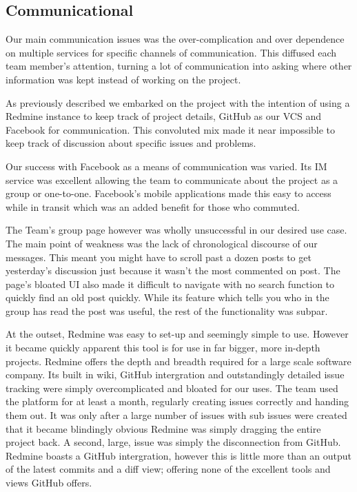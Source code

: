 \documentclass{l3proj}
\begin{document}
\subsection{Communicational}
Our main communication issues was the over-complication and over dependence on multiple services for specific channels of communication. This diffused each team member's attention, turning a lot of communication into asking where other information was kept instead of working on the project.

As previously described we embarked on the project with the intention of using a Redmine instance to keep track of project details, GitHub as our VCS and Facebook for communication. This convoluted mix made it near impossible to keep track of discussion about specific issues and problems.

Our success with Facebook as a means of communication was varied. Its IM service was excellent allowing the team to communicate about the project as a group or one-to-one. Facebook's mobile applications made this easy to access while in transit which was an added benefit for those who commuted.

The Team's group page however was wholly unsuccessful in our desired use case. The main point of weakness was the lack of chronological discourse of our messages. This meant you might have to scroll past a dozen posts to get yesterday's discussion just because it wasn't the most commented on post. The page's bloated UI also made it difficult to navigate with no search function to quickly find an old post quickly. While its feature which tells you who in the group has read the post was useful, the rest of the functionality was subpar.

At the outset, Redmine was easy to set-up and seemingly simple to use. However it became quickly apparent this tool is for use in far bigger, more in-depth projects.
Redmine offers the depth and breadth required for a large scale software company. Its built in wiki, GitHub intergration and outstandingly detailed issue tracking were simply overcomplicated and bloated for our uses. The team used the platform for at least a month, regularly creating issues correctly and handing them out. It was only after a large number of issues with sub issues were created that it became blindingly obvious Redmine was simply dragging the entire project back. A second, large, issue was simply the disconnection from GitHub. Redmine boasts a GitHub intergration, however this is little more than an output of the latest commits and a diff view; offering none of the excellent tools and views GitHub offers.
\end{document}
